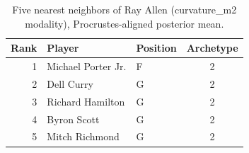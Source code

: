 \begin{table}[htbp]
  \centering\small
  \begin{tabular}{rllc}
    \toprule
    Rank & Player & Position & Archetype \\
    \midrule
    1 & Michael Porter Jr. & F & 2 \\
    2 & Dell Curry & G & 2 \\
    3 & Richard Hamilton & G & 2 \\
    4 & Byron Scott & G & 2 \\
    5 & Mitch Richmond & G & 2 \\
    \bottomrule
  \end{tabular}
  \caption{Five nearest neighbors of Ray Allen (curvature_m2 modality), Procrustes-aligned posterior mean.}
  \label{tab:Ray_Allen_neighbors_curvature_m2}
\end{table}

